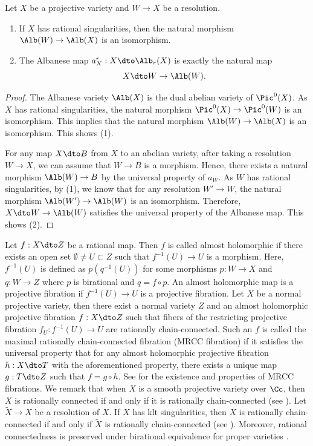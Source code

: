 \documentclass[11pt]{amsart}
\begin{document}
\begin{proposition}\label{prop: albanese}
Let $X$ be a projective variety and $W\to X$ be a resolution.
\begin{enumerate}
\item If $X$ has rational singularities, then the natural morphism $\Alb(W) \to \Alb(X)$ is an isomorphism.
\item The Albanese map $a^r_X: X \dto \Alb_r(X)$ is exactly the natural map
\[
X \dto W \to \Alb(W).
\]
\end{enumerate}
\end{proposition}
\begin{proof}
The Albanese variety $\Alb(X)$ is the dual abelian variety of $\Pic^0(X)$. As $X$ has rational singularities, the natural morphism $\Pic^0(X) \to \Pic^0(W)$ is an isomorphism. This implies that the natural morphism $\Alb(W) \to \Alb(X)$ is an isomorphism. This shows (1).

For any map $X \dto B$ from $X$ to an abelian variety, after taking a resolution $W \to X$, we can assume that $W \to B$ is a morphism. Hence, there exists a natural morphism $\Alb(W) \to B$ by the universal property of $a_W$. As $W$ has rational singularities, by (1), we know that for any resolution $W' \to W$, the natural morphism $\Alb(W') \to \Alb(W)$ is an isomorphism. Therefore, $X \dto W \to \Alb(W)$ satisfies the universal property of the Albanese map. This shows (2).
\end{proof}


Let $f: X \dto Z$ be a rational map. Then $f$ is called almost holomorphic if there exists an open set $\emptyset \neq U \subset Z$ such that $f^{-1}(U) \to U$ is a morphism. Here, $f^{-1}(U)$ is defined as $p(q^{-1}(U))$ for some morphisms $p: W \to X$ and $q: W \to Z$ where $p$ is birational and $q=f\circ p$. An almost holomorphic map is a projective fibration if $f^{-1}(U) \to U$ is a projective fibration. Let $X$ be a normal projective variety, then there exist a normal variety $Z$ and an almost holomorphic projective fibration $f: X \dto Z$ such that fibers of the restricting projective fibration $f_U: f^{-1}(U) \to U$ are rationally chain-connected. Such an $f$ is called the maximal rationally chain-connected fibration (MRCC fibration) if it satisfies the universal property that for any almost holomorphic projective fibration $h: X \dto T$ with the aforementioned property, there exists a unique map $g: T \dto Z$ such that $f= g\circ h$. See \cite[\S 5.5]{Deb01} for the existence and properties of MRCC fibrations. We remark that when $X$ is a smooth projective variety over $\Cc$, then $X$ is rationally connected if and only if it is rationally chain-connected (see \cite[Corollary 4.28]{Deb01}). Let $\tilde{X} \to X$ be a resolution of $X$. If $X$ has klt singularities, then $X$ is rationally chain-connected if and only if $\tilde{X}$ is rationally chain-connected (see \cite[Corollary 1.6]{HM07}). Moreover, rational connectedness is preserved under birational equivalence for proper varieties \cite[(IV. (3.3.3))]{Kol96}.
\end{document}
